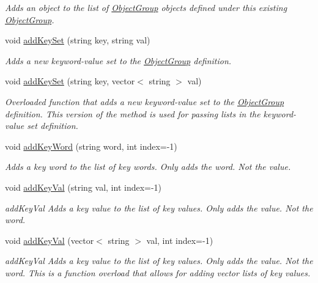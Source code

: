\begin{DoxyCompactItemize}
\begin{DoxyCompactList}\small\item\em Adds an object to the list of \hyperlink{class_object_group}{Object\-Group} objects defined under this existing \hyperlink{class_object_group}{Object\-Group}. \end{DoxyCompactList}\item 
void \hyperlink{class_object_group_a23d0301a66911f11396af70f514db98a}{add\-Key\-Set} (string key, string val)
\begin{DoxyCompactList}\small\item\em Adds a new keyword-\/value set to the \hyperlink{class_object_group}{Object\-Group} definition. \end{DoxyCompactList}\item 
void \hyperlink{class_object_group_a003feed14deff33954d7076a791615d4}{add\-Key\-Set} (string key, vector$<$ string $>$ val)
\begin{DoxyCompactList}\small\item\em Overloaded function that adds a new keyword-\/value set to the \hyperlink{class_object_group}{Object\-Group} definition. This version of the method is used for passing lists in the keyword-\/value set definition. \end{DoxyCompactList}\item 
void \hyperlink{class_object_group_a7d230b4f3ccbb25a8399a8c77262bdd5}{add\-Key\-Word} (string word, int index=-\/1)
\begin{DoxyCompactList}\small\item\em Adds a key word to the list of key words. Only adds the word. Not the value. \end{DoxyCompactList}\item 
void \hyperlink{class_object_group_ac8389b0f27845d119f6196692aa2fa9a}{add\-Key\-Val} (string val, int index=-\/1)
\begin{DoxyCompactList}\small\item\em add\-Key\-Val Adds a key value to the list of key values. Only adds the value. Not the word. \end{DoxyCompactList}\item 
void \hyperlink{class_object_group_a6906b56b5d4105e3a9452f7c69d73eea}{add\-Key\-Val} (vector$<$ string $>$ val, int index=-\/1)
\begin{DoxyCompactList}\small\item\em add\-Key\-Val Adds a key value to the list of key values. Only adds the value. Not the word. This is a function overload that allows for adding vector lists of key values. \end{DoxyCompactList}\item 

\end{DoxyCompactItemize}
